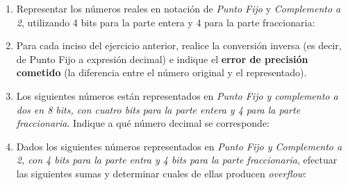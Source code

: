 \documentclass[12pt]{article}
\begin{document}
\begin{enumerate}

    \item Representar los números reales en notación de \emph{Punto Fijo} y
        \emph{Complemento a 2}, utilizando 4 bits para la parte entera y 4
        para la parte fraccionaria:


    \item Para cada inciso del ejercicio anterior, realice la conversión
        inversa (es decir, de Punto Fijo a expresión decimal) e indique el
        \textbf{error de precisión cometido} (la diferencia entre el número
        original y el representado).

    \item Los siguientes números están representados en \emph{Punto Fijo
        y complemento a dos en 8 bits, con cuatro bits para la parte entera y
        4 para la parte fraccionaria}. Indique a qué número decimal se corresponde:


    \item Dados los siguientes números representados en \emph{Punto Fijo y
        Complemento a 2, con 4 bits para la parte entra y 4 bits para la parte
        fraccionaria}, efectuar las siguientes sumas y determinar cuales de ellas
        producen \emph{overflow}:


\end{enumerate}
\end{document}
